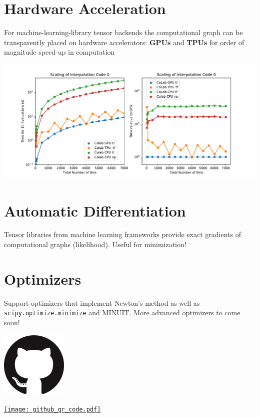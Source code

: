 \documentclass[a0,portrait]{a0poster}
\begin{document}
\begin{multicols}{2}
 \section*{\LARGE\color{MediumBlue} Hardware Acceleration}
 For machine-learning-library tensor backends the computational graph can be transparently placed on hardware accelerators: \textbf{GPUs} and \textbf{TPUs} for order of magnitude speed-up in computation
 \begin{center}
  \includegraphics[width=\linewidth]{scaling_hardware.pdf}
 \end{center}

 \section*{\LARGE\color{MediumBlue} Automatic Differentiation}

 Tensor libraries from machine learning frameworks provide exact gradients of computational graphs (likelihood). Useful for minimization!

 \section*{\LARGE\color{MediumBlue} Optimizers}

 Support optimizers that implement Newton's method as well as \texttt{scipy.optimize.minimize} and MINUIT. More advanced optimizers to come soon!

 \vspace{1cm}
 \begin{minipage}{0.5\linewidth}
  \begin{flushright}
   \href{https://github.com/diana-hep/pyhf}{\includegraphics[width=0.3\linewidth]{GitHub_logo.png}}
  \end{flushright}
 \end{minipage}%
 \quad
 \begin{minipage}{0.5\linewidth}
  \begin{flushleft}
   \href{https://github.com/diana-hep/pyhf}{\texttt{[image: github\_qr\_code.pdf]}}
  \end{flushleft}
 \end{minipage}%


\end{multicols}
\end{document}
